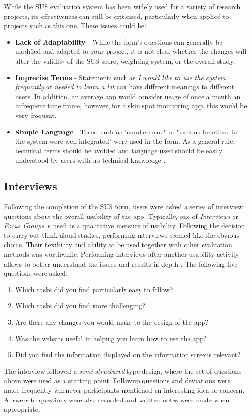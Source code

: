 While the SUS evaluation system has been widely used for a variety of research projects, its effectiveness can still be criticised, particularly when applied to projects such as this one. These issues could be:
\begin{itemize}
    \item \textbf{Lack of Adaptability} - While the form's questions can generally be modified and adapted to your project, it is not clear whether the changes will alter the validity of the SUS score, weighting system, or the overall study.
    \item \textbf{Imprecise Terms} - Statements such as \emph{I would like to use the system frequently} or \emph{needed to learn a lot} can have different meanings to different users. In addition, an average app would consider usage of once a month an infrequent time frame, however, for a skin spot monitoring app, this would be very frequent.
    \item \textbf{Simple Language} - Terms such as "cumbersome" or "various functions in the system were well integrated" were used in the form. As a general rule, technical terms should be avoided and language used should be easily understood by users with no technical knowledge \cite{harrison2007tip}.
\end{itemize}

\subsection{Interviews}
Following the completion of the SUS form, users were asked a series of interview questions about the overall usability of the app. Typically, one of \emph{Interviews} or \emph{Focus Groups} is used as a qualitative measure of usability. Following the decision to carry out think-aloud studies, performing interviews seemed like the obvious choice. Their flexibility and ability to be used together with other evaluation methods was worthwhile. Performing interviews after another usability activity allows to better understand the issues and results in depth \cite{courage2005understanding}.
The following five questions were asked:
\begin{enumerate}
    \item Which tasks did you find particularly easy to follow?
    \item Which tasks did you find more challenging?
    \item Are there any changes you would make to the design of the app?
    \item Was the website useful in helping you learn how to use the app?
    \item Did you find the information displayed on the information screens relevant?
\end{enumerate}
The interview followed a \emph{semi-structured} type design, where the set of questions above were used as a starting point. Followup questions and deviations were made frequently whenever participants mentioned an interesting idea or concern. Answers to questions were also recorded and written notes were made when appropriate.

